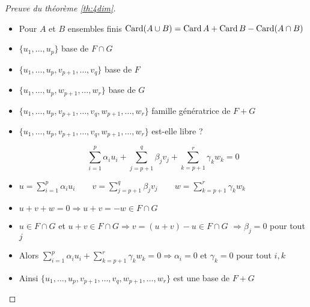 \begin{frame}
\begin{proof}[Preuve du théorème \ref{th:4dim}]
\pause
\begin{itemize}
  \item Pour $A$ et $B$ ensembles finis
$\mathop{\text{Card}}\nolimits (A\cup B) = \mathop{\text{Card}}\nolimits A + \mathop{\text{Card}}\nolimits B - \mathop{\text{Card}}\nolimits (A\cap B)$
  
  \pause 
  \item $\{u_1,\ldots,u_p\}$ base de $F \cap G$
  
  \pause
  \item
$ \{u_1,\ldots,u_p,v_{p+1},\ldots,v_q\}$ base de $F$

\pause
\item
$ \{u_1,\ldots,u_p,w_{p+1},\ldots,w_r\}$ base de $G$

  \pause
  \item 
  $\{ u_1,\ldots,u_p,v_{p+1},\ldots,v_q,w_{p+1},\ldots,w_r\}$ famille g\'en\'eratrice de  $F+G$
  
  
  \pause
  \item $\{ u_1,\ldots,u_p,v_{p+1},\ldots,v_q,w_{p+1},\ldots,w_r\}$  est-elle libre ?
  
  \pause
 $$
  \sum_{i=1}^p \alpha_i u_i + \sum_{j=p+1}^q \beta_j v_j + \sum_{k=p+1}^r \gamma_k w_k = 0
 $$
 
 \pause
 \item
  $u=\sum_{i=1}^p \alpha_i u_i \qquad v=\sum_{j=p+1}^q \beta_j v_j \qquad w=\sum_{k=p+1}^r \gamma_k w_k$
  
  \pause
  \item $u+v+w = 0\Rightarrow  u+v = -w \in F\cap G$
  
  
  
  \pause
  \item    
  $u\in F\cap G$ et $u+v  \in F\cap G\Rightarrow v = (u+v) - u\in F\cap G$
$\Rightarrow \beta_j=0$ pour tout $j$
\pause
\item  
 Alors 
  $\sum_{i=1}^p \alpha_i u_i  + \sum_{k=p+1}^r \gamma_k w_k = 0\Rightarrow \alpha_i = 0 $ et  $\gamma_k = 0$
 pour tout $i,k$
 
 \pause
 \item
  Ainsi $ \{ u_1,\ldots,u_p,v_{p+1},\ldots,v_q,w_{p+1},\ldots,w_r\}$ est une base de $F+G$
  \qedhere
\end{itemize}
\end{proof}

\end{frame}


